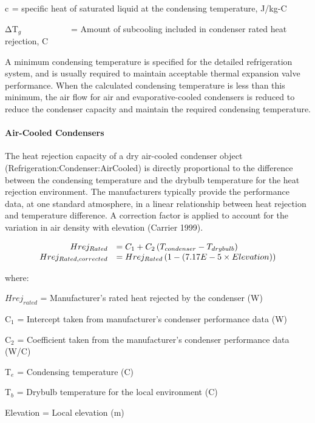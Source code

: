 c\(_{ }\) = specific heat of saturated liquid at the condensing temperature, J/kg-C

ΔT\(_{g}\)~~~~~~~~~~~ = Amount of subcooling included in condenser rated heat rejection, C

A minimum condensing temperature is specified for the detailed refrigeration system, and is usually required to maintain acceptable thermal expansion valve performance. When the calculated condensing temperature is less than this minimum, the air flow for air and evaporative-cooled condensers is reduced to reduce the condenser capacity and maintain the required condensing temperature.

\paragraph{Air-Cooled Condensers}\label{air-cooled-condensers}

The heat rejection capacity of a dry air-cooled condenser object (Refrigeration:Condenser:AirCooled) is directly proportional to the difference between the condensing temperature and the drybulb temperature for the heat rejection environment. The manufacturers typically provide the performance data, at one standard atmosphere, in a linear relationship between heat rejection and temperature difference. A correction factor is applied to account for the variation in air density with elevation (Carrier 1999).

\begin{equation}
  \begin{array}{rl}
    Hrej_{Rated} &= C_1 + C_2 \PB{T_{condenser} - T_{drybulb}} \\
    Hrej_{Rated,corrected} &= Hrej_{Rated} \PB{1 - \PB{7.17E-5 \times Elevation}}
  \end{array}
\end{equation}

where:

\(Hrej_{rated}\) = Manufacturer's rated heat rejected by the condenser (W)

C\(_{1}\) = Intercept taken from manufacturer's condenser performance data (W)

C\(_{2}\) = Coefficient taken from the manufacturer's condenser performance data (W/C)

T\(_{e}\) = Condensing temperature (C)

T\(_{b}\) = Drybulb temperature for the local environment (C)

Elevation = Local elevation (m)


